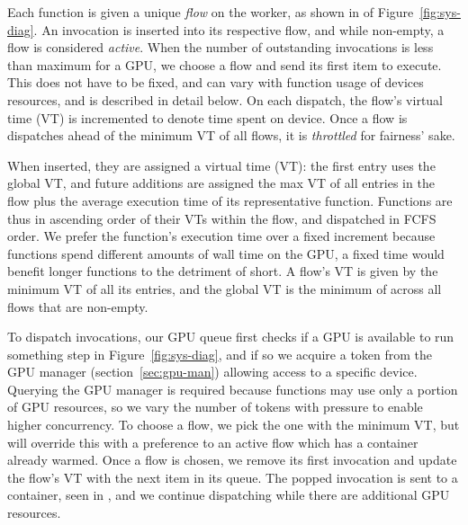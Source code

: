 Each function is given a unique \emph{flow} on the worker, as shown in  of Figure~\ref{fig:sys-diag}.
An invocation is inserted into its respective flow, and while non-empty, a flow is considered \emph{active}.
When the number of outstanding invocations is less than maximum \D for a GPU, we choose a flow and send its first item to execute.
This \D does not have to be fixed, and can vary with function usage of devices resources, and is described in detail below.
On each dispatch, the flow's virtual time (VT) is incremented to denote time spent on device. 
Once a flow is \T dispatches ahead of the minimum VT of all flows, it is \emph{throttled} for fairness' sake.

When inserted, they are assigned a virtual time (VT): the first entry uses the global VT, and future additions are assigned the max VT of all entries in the flow plus the average execution time of its representative function.
Functions are thus in ascending order of their VTs within the flow, and dispatched in FCFS order.
We prefer the function's execution time over a fixed increment because functions spend different amounts of wall time on the GPU, a fixed time would benefit longer functions to the detriment of short.
A flow's VT is given by the minimum VT of all its entries, and the global VT is the minimum of across all flows that are non-empty.

To dispatch invocations, our GPU queue first checks if a GPU is available to run something step  in Figure~\ref{fig:sys-diag}, and if so we acquire a token from the GPU manager (section~\ref{sec:gpu-man}) allowing access to a specific device.
Querying the GPU manager is required because functions may use only a portion of GPU resources, so we vary the number of tokens with pressure to enable higher concurrency.
To choose a flow, we pick the one with the minimum VT, but will override this with a preference to an active flow which has a container already warmed.
Once a flow is chosen, we remove its first invocation and update the flow's VT with the next item in its queue.
The popped invocation is sent to a container, seen in , and we continue dispatching while there are additional GPU resources.

